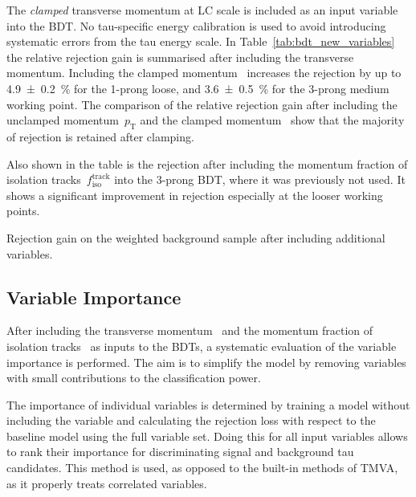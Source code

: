 The \emph{clamped} transverse momentum at LC scale is included as an input
variable into the BDT. No tau-specific energy calibration is used to avoid
introducing systematic errors from the tau energy scale. In
Table~\ref{tab:bdt_new_variables} the relative rejection gain is summarised
after including the transverse momentum. Including the clamped
momentum~ increases the rejection by up to
\SI{4.9 +- 0.2}{\percent} for the 1-prong loose, and \SI{3.6 +- 0.5}{\percent}
for the 3-prong medium working point. The comparison of the relative rejection
gain after including the unclamped momentum~$p_\text{T}$ and the clamped
momentum~ show that the majority of rejection
is retained after clamping.

Also shown in the table is the rejection after including the momentum fraction
of isolation tracks~$f_\text{iso}^\text{track}$ into the 3-prong BDT, where it
was previously not used. It shows a significant improvement in rejection
especially at the looser working points.

\begin{table}[htb]
  \centering
  {\small}
  \caption{Rejection gain on the weighted background sample after including
    additional variables.}
  \label{tab:bdt_new_variables}
\end{table}

\subsection{Variable Importance}
\label{sec:bdt_var_importance}

After including the transverse momentum~ and
the momentum fraction of isolation tracks~ as
inputs to the BDTs, a systematic evaluation of the variable importance is
performed. The aim is to simplify the model by removing variables with small
contributions to the classification power.

The importance of individual variables is determined by training a model without
including the variable and calculating the rejection loss with respect to the
baseline model using the full variable set. Doing this for all input variables
allows to rank their importance for discriminating signal and background tau
candidates. This method is used, as opposed to the built-in methods of TMVA, as
it properly treats correlated variables.

